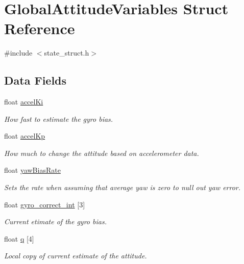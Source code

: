 \hypertarget{struct_global_attitude_variables}{\section{\-Global\-Attitude\-Variables \-Struct \-Reference}
\label{struct_global_attitude_variables}
}


{\ttfamily \#include $<$state\-\_\-struct.\-h$>$}

\subsection*{\-Data \-Fields}
\begin{DoxyCompactItemize}
\item 
float \hyperlink{group___state_estimation_filters_ga0a9a06d18d9d208192de6edeed98fbe8}{accel\-Ki}
\begin{DoxyCompactList}\small\item\em \-How fast to estimate the gyro bias. \end{DoxyCompactList}\item 
float \hyperlink{group___state_estimation_filters_gaf9246ddec8582b6b47b752019c29b2e4}{accel\-Kp}
\begin{DoxyCompactList}\small\item\em \-How much to change the attitude based on accelerometer data. \end{DoxyCompactList}\item 
float \hyperlink{group___state_estimation_filters_ga0c53c008608a5724b2d563fd5b560905}{yaw\-Bias\-Rate}
\begin{DoxyCompactList}\small\item\em \-Sets the rate when assuming that average yaw is zero to null out yaw error. \end{DoxyCompactList}\item 
float \hyperlink{group___state_estimation_filters_gac754011cf55a0c78cb770e48567802ba}{gyro\-\_\-correct\-\_\-int} \mbox{[}3\mbox{]}
\begin{DoxyCompactList}\small\item\em \-Current etimate of the gyro bias. \end{DoxyCompactList}\item 
float \hyperlink{group___state_estimation_filters_ga34a6662a3aea49780925afa629a917cf}{q} \mbox{[}4\mbox{]}
\begin{DoxyCompactList}\small\item\em \-Local copy of current estimate of the attitude. \end{DoxyCompactList}\item 

\end{DoxyCompactItemize}
